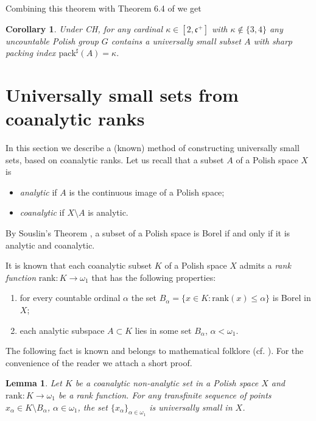 \documentclass[11pt]{amsart}
\newtheorem{lemma}{Lemma}
\newtheorem{corollary}{Corollary}
\begin{document}
Combining this theorem with Theorem 6.4 of \cite{BLR} we get

\begin{corollary} Under CH, for any cardinal $\kappa\in[2,\mathfrak c^+]$ with $\kappa\notin\{3,4\}$ any uncountable Polish group $G$ contains a universally small subset $A$ with sharp packing index ${\mathrm{pack}}^\sharp(A)=\kappa$.
\end{corollary}

\section{Universally small sets from coanalytic ranks}

In this section we describe a (known) method of constructing universally small sets, based on coanalytic ranks. Let us recall that a subset $A$ of a Polish space $X$ is
\begin{itemize}
\item {\em analytic} if $A$ is the continuous image of a Polish space;
\item {\em coanalytic} if $X\setminus A$ is analytic.
\end{itemize}
By Souslin's  Theorem \cite[14.11]{Ke}, a subset of a Polish space is Borel if and only if it is analytic and coanalytic.

It is known \cite[34.4]{Ke} that each coanalytic subset $K$ of a Polish space $X$ admits a {\em rank function} ${\mathrm{rank}}:K\to{\omega}_1$ that has the following properties:
\begin{enumerate}
\item for every countable ordinal $\alpha$ the set $B_\alpha=\{x\in K:{\mathrm{rank}}(x)\le\alpha\}$ is Borel in $X$;
\item each analytic subspace $A\subset K$ lies in some set $B_\alpha$, $\alpha<{\omega}_1$.
\end{enumerate}

The following fact is known and belongs to mathematical folklore (cf. \cite[5.3]{Miller}). For the convenience of the reader we attach a short proof.

\begin{lemma}\label{l1} Let $K$ be a coanalytic non-analytic set in a Polish space $X$ and ${\mathrm{rank}}:K\to{\omega}_1$ be a rank function. For any transfinite sequence of points $x_\alpha\in K\setminus B_\alpha$, $\alpha\in{\omega}_1$, the set $\{x_\alpha\}_{\alpha\in{\omega}_1}$ is universally small in $X$.
\end{lemma}
\end{document}
